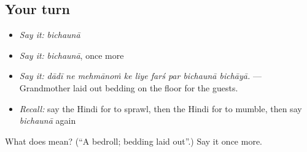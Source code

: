 \subsection*{Your turn}
\begin{itemize}
\raggedright
  \item \emph{Say it:} \emph{bichaunā}
  \item \emph{Say it:} \emph{bichaunā}, once more
  \item \emph{Say it:} \emph{dādī ne mehmānoṁ ke liye farś par bichaunā bichāyā.} — Grandmother laid out bedding on the floor for the guests.
  \item \emph{Recall:} say the Hindi for to sprawl, then the Hindi for to mumble, then say \emph{bichaunā} again
\end{itemize}

\begin{tcolorbox}[breakable,colback=teal!4,colframe=teal!35!black,title={Before you move on}]
What does  mean? (\textquotedblleft{}A bedroll; bedding laid out\textquotedblright{}.) Say it once more.
\end{tcolorbox}
